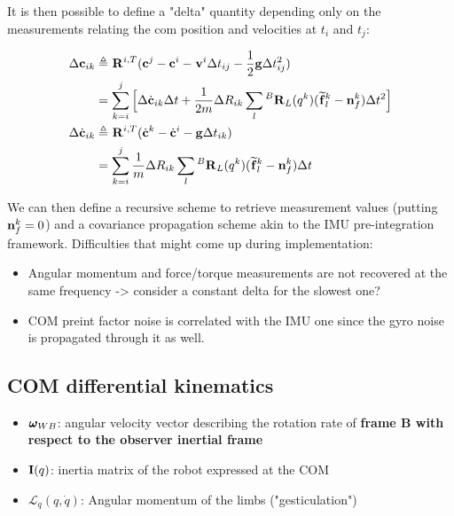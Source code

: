 \documentclass[11pt]{article}
\newcommand{\Rot}[2]{\prescript{#1}{}{\bfR}_{#2}}
\newcommand{\noise}{\bfn}
\newcommand{\vel}[2]{\prescript{#1}{}{\bfv}_{#2}}
\newcommand{\angvel}[2]{\prescript{#1}{}{\pmb{\omega}}_{#2}}
\newcommand{\forcem}[2]{\prescript{#1}{}{\widetilde{\bff}}_{#2}}
\newcommand{\AM}{\mathcal{L}}
\newcommand{\COM}{\bfc}
\newcommand{\grav}{\bfg}
\begin{document}
It is then possible to define a "delta" quantity depending only on the measurements relating the com position and velocities at \(t_i\) and \(t_j\):

\begin{equation}
\begin{split}
    \Delta \COM_{ik} &\triangleq \Rot{}{}^{i,T} (\COM^j - \COM^i - \vel{}{}^i \Delta t_{ij} - \frac{1}{2}\grav \Delta t_{ij}^2) 
    \\
    &= \sum_{k=i}^{j} \Big[ \Delta \dot{\COM}_{ik} \Delta t + \frac{1}{2m} \Delta R_{ik} \sum_l \Rot{B}{L}(q^{k}) (\forcem{}{l}^{k} - \noise_f^{k}) \Delta t^2 \Big]
\\
    \Delta \dot{\COM}_{ik} &\triangleq \Rot{}{}^{i,T} (\dot{\COM}^{k} - \dot{\COM}^{i} - \bfg \Delta t_{ik})
\\
    &= \sum_{k=i}^{j} \frac{1}{m} \Delta R_{ik} \sum_l \Rot{B}{L}(q^{k}) (\forcem{}{l}^{k} - \noise_f^{k}) \Delta t 
\end{split}
\label{eq:COMPreint}
\end{equation}

We can then define a recursive scheme to retrieve measurement values (putting \(\noise_f^{k} = 0\)) and a covariance propagation scheme akin to the IMU pre-integration framework. 
Difficulties that might come up during implementation:

\begin{itemize}
    \item Angular momentum and force/torque measurements are not recovered at the same frequency -> consider a constant delta for the slowest one?
    \item COM preint factor noise is correlated with the IMU one since the gyro noise is propagated through it as well.
\end{itemize}



\subsection{COM differential kinematics}

\begin{itemize}
    \item \( \angvel{}{WB} \): angular velocity vector describing the rotation rate of \textbf{frame B with respect to the observer inertial frame}
    \item \( {\bf I}(q) \): inertia matrix of the robot expressed at the COM
    \item \( \AM_q (q,\dot{q}) \): Angular momentum of the limbs ("gesticulation")
\end{itemize}
\end{document}
